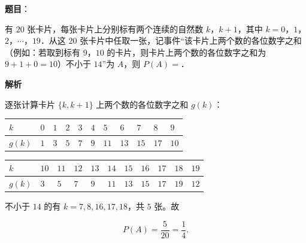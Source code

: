 \begin{answer}

\textbf{题目}：

有 $20$ 张卡片，每张卡片上分别标有两个连续的自然数 $k$，$k+1$，其中 $k=0$，$1$，$2$，$\cdots$，$19$．从这 $20$ 张卡片中任取一张，记事件“该卡片上两个数的各位数字之和（例如：若取到标有 $9$，$10$ 的卡片，则卡片上两个数的各位数字之和为 $9+1+0=10$）不小于 $14$”为 $A$，则 $P(A)=$\gkblank{}．

\textbf{解析}

逐张计算卡片 $\{k,k+1\}$ 上两个数的各位数字之和 $g(k)$：

\begin{center}
\begingroup\setlength{\tabcolsep}{4pt}
\begin{tabular}{lllllllllll}
\toprule
$k$ & $0$ & $1$ & $2$ & $3$ & $4$ & $5$ & $6$ & $7$ & $8$ & $9$ \\
\midrule
$g(k)$ & $1$ & $3$ & $5$ & $7$ & $9$ & $11$ & $13$ & $15$ & $17$ & $10$ \\
\bottomrule
\end{tabular}
\endgroup
\end{center}

\begin{center}
\begingroup\setlength{\tabcolsep}{4pt}
\begin{tabular}{lllllllllll}
\toprule
$k$ & $10$ & $11$ & $12$ & $13$ & $14$ & $15$ & $16$ & $17$ & $18$ & $19$ \\
\midrule
$g(k)$ & $3$ & $5$ & $7$ & $9$ & $11$ & $13$ & $15$ & $17$ & $19$ & $12$ \\
\bottomrule
\end{tabular}
\endgroup
\end{center}

不小于 $14$ 的有 $k=7,8,16,17,18$，共 $5$ 张。故

\nopagebreak[4]
\[P(A)=\frac5{20}=\frac14.\]


\end{answer}
